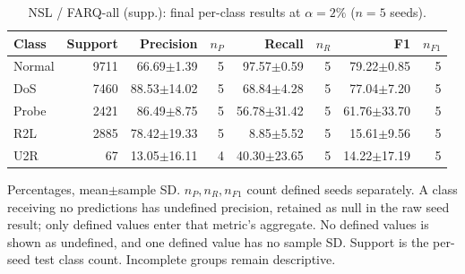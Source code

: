 \begin{table}[t]
\centering\scriptsize
\setlength{\tabcolsep}{3.3pt}
\caption{NSL / FARQ-all (supp.): final per-class results at $\alpha=2\%$ ($n=5$ seeds).}\label{tab:forgetting-class-nsl_kdd-farq-all}
\begin{tabular}{lrrrrrrr}
\toprule
Class & Support & Precision & $n_P$ & Recall & $n_R$ & F1 & $n_{F1}$ \\
\midrule
Normal & 9711 & 66.69$\pm$1.39 & 5 & 97.57$\pm$0.59 & 5 & 79.22$\pm$0.85 & 5 \\
DoS & 7460 & 88.53$\pm$14.02 & 5 & 68.84$\pm$4.28 & 5 & 77.04$\pm$7.20 & 5 \\
Probe & 2421 & 86.49$\pm$8.75 & 5 & 56.78$\pm$31.42 & 5 & 61.76$\pm$33.70 & 5 \\
R2L & 2885 & 78.42$\pm$19.33 & 5 & 8.85$\pm$5.52 & 5 & 15.61$\pm$9.56 & 5 \\
U2R & 67 & 13.05$\pm$16.11 & 4 & 40.30$\pm$23.65 & 5 & 14.22$\pm$17.19 & 5 \\
\bottomrule
\end{tabular}
\par\smallskip\begin{minipage}{0.98\textwidth}\scriptsize Percentages, mean$\pm$sample SD. $n_P,n_R,n_{F1}$ count defined seeds separately. A class receiving no predictions has undefined precision, retained as null in the raw seed result; only defined values enter that metric's aggregate. No defined values is shown as undefined, and one defined value has no sample SD. Support is the per-seed test class count. Incomplete groups remain descriptive.\end{minipage}
\end{table}

